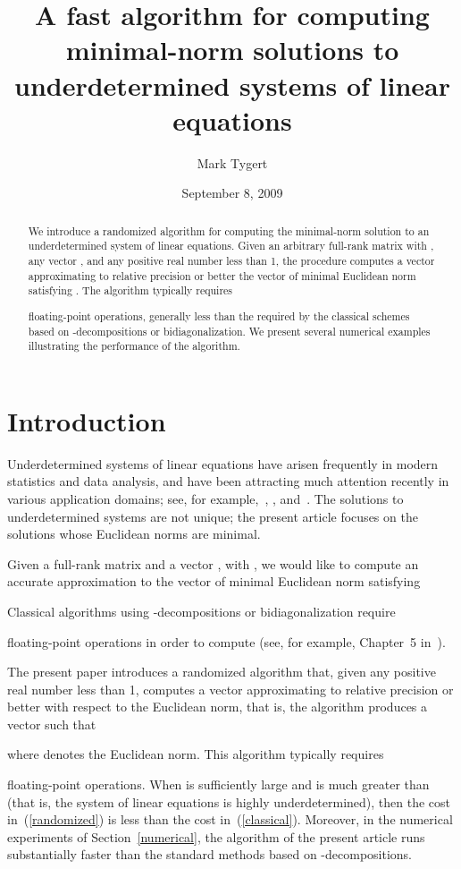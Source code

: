 \documentclass[letterpaper,12pt]{article}
\title{A fast algorithm for computing minimal-norm solutions
       to underdetermined systems of linear equations}
\author{Mark Tygert}
\date{September 8, 2009}
\begin{document}
\maketitle

\begin{abstract}
We introduce a randomized algorithm
for computing the minimal-norm solution
to an underdetermined system of linear equations.
Given an arbitrary full-rank matrix  with ,
any vector , and any positive real number 
less than 1, the procedure computes a vector 
approximating to relative precision  or better
the vector  of minimal Euclidean norm satisfying
.
The algorithm typically requires

floating-point operations,
generally less than the  required
by the classical schemes based on -decompositions or bidiagonalization.
We present several numerical examples illustrating the performance
of the algorithm.
\end{abstract}



\section{Introduction}

Underdetermined systems of linear equations have arisen frequently
in modern statistics and data analysis, and have been attracting
much attention recently in various application domains;
see, for example,~\cite{bruckstein-donoho-elad}, \cite{candes-tao},
and~\cite{donoho}.
The solutions to underdetermined systems are not unique;
the present article focuses on the solutions whose Euclidean norms
are minimal.

Given a full-rank matrix  and a vector ,
with , we would like to compute an accurate approximation
to the vector  of minimal Euclidean norm satisfying

Classical algorithms using -decompositions or bidiagonalization require

floating-point operations in order to compute 
(see, for example, Chapter~5 in~\cite{golub-van_loan}).

The present paper introduces a randomized algorithm that,
given any positive real number  less than 1,
computes a vector  approximating 
to relative precision  or better
with respect to the Euclidean norm, that is,
the algorithm produces a vector  such that

where  denotes the Euclidean norm.
This algorithm typically requires

floating-point operations.
When  is sufficiently large and  is much greater than 
(that is, the system of linear equations is highly underdetermined),
then the cost in~(\ref{randomized}) is less than
the cost in~(\ref{classical}).
Moreover, in the numerical experiments of Section~\ref{numerical},
the algorithm of the present article runs substantially faster than
the standard methods based on -decompositions.
\end{document}

